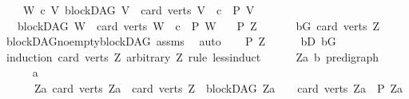 \begin{isabellebody}
\ \ \ \ {\isachardoublequoteopen}{\isasymAnd}W\ c{\isachardot}{\kern0pt}\ {\isacharparenleft}{\kern0pt}{\isasymAnd}V{\isachardot}{\kern0pt}\ {\isacharparenleft}{\kern0pt}blockDAG\ V\ {\isasymLongrightarrow}\ card\ {\isacharparenleft}{\kern0pt}verts\ V{\isacharparenright}{\kern0pt}\ {\isacharless}{\kern0pt}\ c\ {\isasymLongrightarrow}\ P\ V{\isacharparenright}{\kern0pt}{\isacharparenright}{\kern0pt}\ \isanewline
\ \ {\isasymLongrightarrow}\ {\isacharparenleft}{\kern0pt}blockDAG\ W\ {\isasymLongrightarrow}\ card\ {\isacharparenleft}{\kern0pt}verts\ W{\isacharparenright}{\kern0pt}\ {\isacharequal}{\kern0pt}\ c\ {\isasymLongrightarrow}\ P\ W{\isacharparenright}{\kern0pt}{\isachardoublequoteclose}\isanewline
\ \ \ {\isachardoublequoteopen}P\ Z{\isachardoublequoteclose}\isanewline
%
\isadelimproof
%
\endisadelimproof
%
\isatagproof
{}\isamarkupfalse%
\ {\isacharminus}{\kern0pt}\ \isanewline
\ \ \isamarkupfalse%
\ bG{\isacharcolon}{\kern0pt}\ {\isachardoublequoteopen}card\ {\isacharparenleft}{\kern0pt}verts\ Z{\isacharparenright}{\kern0pt}\ {\isachargreater}{\kern0pt}\ {}{\isachardoublequoteclose}\ \isamarkupfalse%
\ blockDAG{\isachardot}{\kern0pt}no{\isacharunderscore}{\kern0pt}empty{\isacharunderscore}{\kern0pt}blockDAG\ assms{\isacharparenleft}{\kern0pt}{}{\isacharparenright}{\kern0pt}\ \isamarkupfalse%
\ auto\isanewline
\ \ \isamarkupfalse%
\ {\isachardoublequoteopen}P\ Z{\isachardoublequoteclose}\isanewline
\ \ \ \ \isamarkupfalse%
\ bD\ bG\isanewline
\ \ \isamarkupfalse%
\ {\isacharparenleft}{\kern0pt}induction\ {\isachardoublequoteopen}card\ {\isacharparenleft}{\kern0pt}verts\ Z{\isacharparenright}{\kern0pt}{\isachardoublequoteclose}\ arbitrary{\isacharcolon}{\kern0pt}\ Z\ rule{\isacharcolon}{\kern0pt}\ less{\isacharunderscore}{\kern0pt}induct{\isacharparenright}{\kern0pt}\isanewline
\ \ \ \ \isamarkupfalse%
\ Z{\isacharcolon}{\kern0pt}{\isacharcolon}{\kern0pt}{\isachardoublequoteopen}{\isacharparenleft}{\kern0pt}{\isacharprime}{\kern0pt}a{\isacharcomma}{\kern0pt}\ {\isacharprime}{\kern0pt}b{\isacharparenright}{\kern0pt}\ pre{\isacharunderscore}{\kern0pt}digraph{\isachardoublequoteclose}\isanewline
\ \ \ \ \isamarkupfalse%
\ a{\isacharcolon}{\kern0pt}\isanewline
\ \ \ \ \ \ {\isachardoublequoteopen}{\isacharparenleft}{\kern0pt}{\isasymAnd}Za{\isachardot}{\kern0pt}\ card\ {\isacharparenleft}{\kern0pt}verts\ Za{\isacharparenright}{\kern0pt}\ {\isacharless}{\kern0pt}\ card\ {\isacharparenleft}{\kern0pt}verts\ Z{\isacharparenright}{\kern0pt}\ {\isasymLongrightarrow}\ blockDAG\ Za\ {\isasymLongrightarrow}\ {}\ {\isacharless}{\kern0pt}\ card\ {\isacharparenleft}{\kern0pt}verts\ Za{\isacharparenright}{\kern0pt}\ {\isasymLongrightarrow}\ P\ Za{\isacharparenright}{\kern0pt}{\isachardoublequoteclose}\isanewline

\end{isabellebody}
